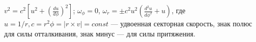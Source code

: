 $v^2=c^2[u^2+(\frac{du}{d\phi})^2]$; $\omega_{\phi}=0$, $\omega_{r}=\pm c^2u^2(\frac{d^2u}{d\phi^2}+u)$,
где $u=1/r, c=r^2\phi=|r\times v|=const$ --- удвоенная секторная скорость, знак полюс для силы отталкивания, знак минус --- 
для силы притяжения.
